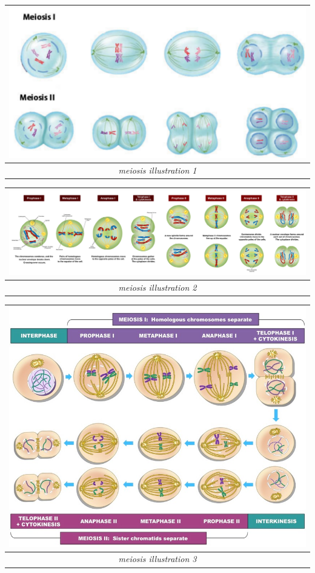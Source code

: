 \documentclass[
]{book}
\begin{document}
\begin{longtable}[]{@{}c@{}}
\toprule\noalign{}
\includegraphics{./img/meiosis2.png} \\
\midrule\noalign{}
\endhead
\bottomrule\noalign{}
\endlastfoot
\emph{meiosis illustration 1} \\
\end{longtable}

\begin{longtable}[]{@{}c@{}}
\toprule\noalign{}
\includegraphics{./img/Meiosis_Stages.svg.png} \\
\midrule\noalign{}
\endhead
\bottomrule\noalign{}
\endlastfoot
\emph{meiosis illustration 2} \\
\end{longtable}

\begin{longtable}[]{@{}c@{}}
\toprule\noalign{}
\includegraphics{./img/meiosis-complex_med.jpeg} \\
\midrule\noalign{}
\endhead
\bottomrule\noalign{}
\endlastfoot
\emph{meiosis illustration 3} \\
\end{longtable}
\end{document}
